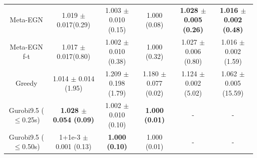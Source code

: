 \begin{table}[t]
\begin{minipage}{1.00 \linewidth}
{\begin{tabular}{@{}cccccc@{}}
Meta-EGN          & 1.019 \hspace{-0.3mm}$\pm$\hspace{-0.3mm} 0.017(0.29) & 1.003 \hspace{-0.3mm}$\pm$\hspace{-0.3mm} 0.010 (0.15) & 1.000 (0.08)             &    \textbf{1.028 \hspace{-0.3mm}$\pm$\hspace{-0.3mm} 0.005 (0.26)}    &    \textbf{1.016 \hspace{-0.3mm}$\pm$\hspace{-0.3mm} 0.002 (0.48)}    \\
Meta-EGN f-t      & 1.017 \hspace{-0.3mm}$\pm$\hspace{-0.3mm} 0.017(0.80) & 1.002 \hspace{-0.3mm}$\pm$\hspace{-0.3mm} 0.010 (0.38) & 1.000 (0.32)             &   1.027 \hspace{-0.3mm}$\pm$\hspace{-0.3mm} 0.006 (0.80)     &    1.016 \hspace{-0.3mm}$\pm$\hspace{-0.3mm} 0.002 (1.59)    \\ \midrule
Greedy            &     1.014 \hspace{-0.3mm}$\pm$\hspace{-0.3mm} 0.014 (1.95)                &           1.209 \hspace{-0.3mm}$\pm$\hspace{-0.3mm} 0.198 (1.79)            &            1.180 \hspace{-0.3mm}$\pm$\hspace{-0.3mm} 0.077 (0.02)          &    1.124 \hspace{-0.3mm}$\pm$\hspace{-0.3mm} 0.002 (5.02)    &    1.062 \hspace{-0.3mm}$\pm$\hspace{-0.3mm} 0.005 (15.59)    \\ \midrule
Gurobi9.5 ($\leq$0.25s) & \textbf{1.028 \hspace{-0.3mm}$\pm$\hspace{-0.3mm} 0.054 (0.09)} &  1.002 \hspace{-0.3mm}$\pm$\hspace{-0.3mm} 0.010 (0.10)  &    \textbf{1.000 (0.01)}   &   -     &   -     \\
Gurobi9.5 ($\leq$0.50s) & 1+1e-3 \hspace{-0.3mm}$\pm$\hspace{-0.3mm} 0.001 (0.13) &  \textbf{1.000 (0.10)}   &   1.000 (0.01)   &   -     &    -    \\

\end{tabular}}
\end{minipage}
\end{table}
